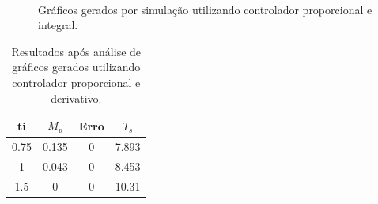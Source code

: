 \documentclass[a4paper]{article}
\begin{document}
\begin{figure}[h]
   \centering
   \\
   \caption{Gráficos gerados por simulação utilizando controlador proporcional e integral.}
   \label{fig:exp2_simulacao}
\end{figure}

\begin{table}[h]
\centering
\begin{tabular}{c c c c}
   \toprule
   ti  & $M_p$   &  Erro  & $T_s$ \\ \midrule
   0.75 & 0.135 & 0      &  7.893 \\
   1   & 0.043  & 0       & 8.453 \\
   1.5   & 0  & 0       & 10.31 \\
   \bottomrule
\end{tabular}
\caption{Resultados após análise de gráficos gerados utilizando controlador proporcional e derivativo.}
\label{tab:exp2_conclusoes}
\end{table}
\end{document}
